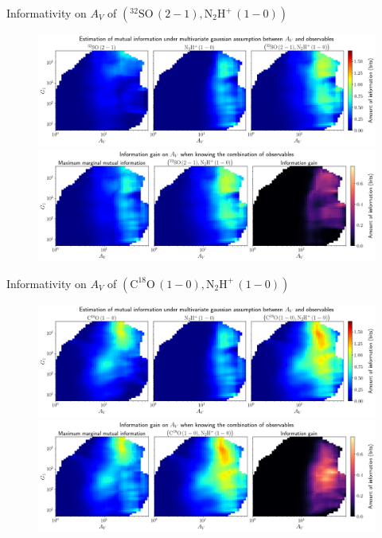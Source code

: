 \documentclass{beamer}
\begin{document}
\begin{frame}{Informativity on $A_V$ of $\left(\mathrm{^{32}SO\,(2-1)},\mathrm{N_2H^+\,(1-0)}\right)$}
    \begin{figure}
        \centering
        \includegraphics[width=0.95\linewidth]{../linearinfo/av__32so21_n2hp10_linearinfo.png}
        \vfill
        \includegraphics[width=0.95\linewidth]{../linearinfo/av__32so21_n2hp10_linearinfo_gain.png}
    \end{figure}
\end{frame}

\begin{frame}{Informativity on $A_V$ of $\left(\mathrm{C^{18}O\,(1-0)},\mathrm{N_2H^+\,(1-0)}\right)$}
    \begin{figure}
        \centering
        \includegraphics[width=0.95\linewidth]{../linearinfo/av__c18o10_n2hp10_linearinfo.png}
        \vfill
        \includegraphics[width=0.95\linewidth]{../linearinfo/av__c18o10_n2hp10_linearinfo_gain.png}
    \end{figure}
\end{frame}
\end{document}
